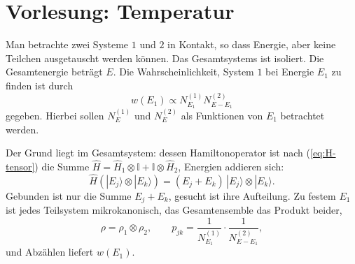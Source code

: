 
\section{Vorlesung: Temperatur}
Man betrachte zwei Systeme $1$ und $2$ in Kontakt, so dass Energie, aber keine Teilchen ausgetauscht werden können. Das Gesamtsystems ist isoliert. Die Gesamtenergie beträgt $E$. Die Wahrscheinlichkeit, System $1$ bei Energie $E_1$ zu finden ist durch
\begin{equation}\label{eq:probenergy}
	w(E_1) \propto N_{E_1}^{(1)}N_{E-E_1}^{(2)}
\end{equation}
gegeben. Hierbei sollen $N_{E}^{(1)}$ und $N_{E}^{(2)}$ als Funktionen von $E_1$ betrachtet werden. 

Der Grund liegt im Gesamtsystem: dessen Hamiltonoperator ist nach (\ref{eq:H-tensor}) die Summe $\widehat{H} = \widehat{H}_1\otimes \mathbb{I} + \mathbb{I}\otimes \widehat{H}_2$, Energien addieren sich:
\begin{equation}
	\widehat{H}\left(|E_j\rangle\otimes |E_k\rangle\right) = (E_j+E_k)\,|E_j\rangle\otimes |E_k\rangle.
\end{equation}
Gebunden ist nur die Summe $E_j+E_k$, gesucht ist ihre Aufteilung. Zu festem $E_1$ ist jedes Teilsystem mikrokanonisch, das Gesamtensemble das Produkt beider,
\begin{equation}
	\rho = \rho_1\otimes \rho_2, \qquad p_{jk} = \frac{1}{N_{E_1}^{(1)}}\cdot\frac{1}{N_{E-E_1}^{(2)}},
\end{equation}
und Abzählen liefert $w(E_1)$.


